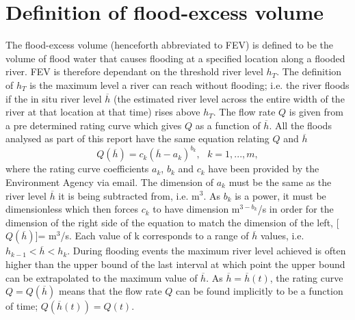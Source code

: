 \documentclass[11pt,a4paper]{article}
\begin{document}
\section{Definition of flood-excess volume}
The flood-excess volume (henceforth abbreviated to FEV) is defined to be the volume of flood water that causes flooding at a specified location along a flooded river. FEV is therefore dependant on the threshold river level $h_T$. The definition of $h_T$ is the maximum level a river can reach without flooding{;} i.e. the river floods if the in situ river level $\overline{h}$ (the estimated river level across the entire width of the river at that location at that time) rises above $h_T$. The flow rate $Q$ is given from a pre determined rating curve which gives $Q$ as a function of $\overline{h}$. All the floods analysed as part of this report have the same equation relating $Q$ and $\overline{h}$
\begin{equation}\tag{2.1}
Q(\overline{h})=c_k (\overline{h}-a_k )^{b_k},\text{ }k=1,...,m,
\end{equation}
where the rating curve coefficients $a_k$, $b_k$ and $c_k$ have been provided by the Environment Agency via email. The dimension of $a_k$ must be the same as the river level $\overline{h}$ it is being subtracted from, i.e. m$^3$. As $b_k$ is a power, it must be dimensionless which then forces $c_k$ to have dimension m$^{3-b_k}$/s in order for the dimension of the right side of the equation to match the dimension of the left, [$Q(\overline{h})$]= m$^3$/s. Each value of k corresponds to a range of $\overline{h}$ values, i.e. $h_{k-1}<\overline{h}<h_k$. During flooding events the maximum river level achieved is often higher than the upper bound of the last interval at which point the upper bound can be extrapolated to the maximum value of $\overline{h}$. As $\overline{h}=\overline{h}(t)$, the rating curve $Q=Q(\overline{h})$ means that the flow rate $Q$ can be found implicitly to be a function of time{;} $Q(\overline{h}(t))=Q(t)$.
\end{document}
